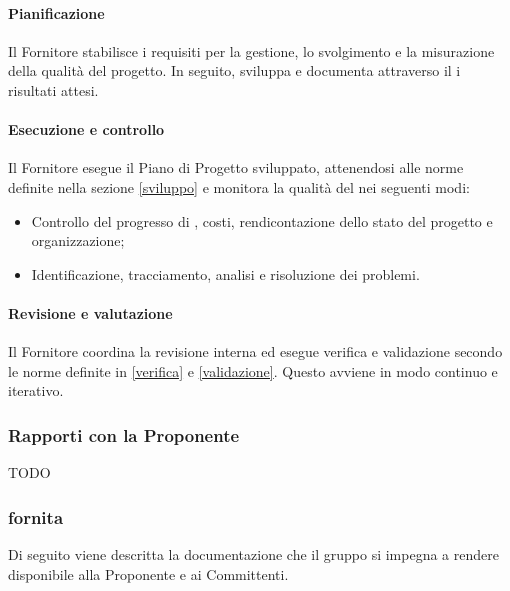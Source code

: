 \paragraph{Pianificazione}
Il Fornitore stabilisce i requisiti per la gestione, lo svolgimento e la misurazione della qualità del progetto. In seguito, sviluppa e documenta attraverso il  i risultati attesi.

\paragraph{Esecuzione e controllo}
Il Fornitore esegue il Piano di Progetto sviluppato, attenendosi alle norme definite nella sezione \ref{sviluppo} e monitora la qualità del  nei seguenti modi:
\begin{itemize}
  \item Controllo del progresso di , costi, rendicontazione dello stato del progetto e organizzazione;
  \item Identificazione, tracciamento, analisi e risoluzione dei problemi.
\end{itemize}

\paragraph{Revisione e valutazione}
Il Fornitore coordina la revisione interna ed esegue verifica e validazione secondo le norme definite in \ref{verifica} e \ref{validazione}. Questo avviene in modo continuo e iterativo.



\subsubsection{Rapporti con la Proponente}
TODO

\subsubsection{ fornita}\label{documentazionefornita}
Di seguito viene descritta la documentazione che il gruppo si impegna a rendere disponibile alla Proponente e ai Committenti.

